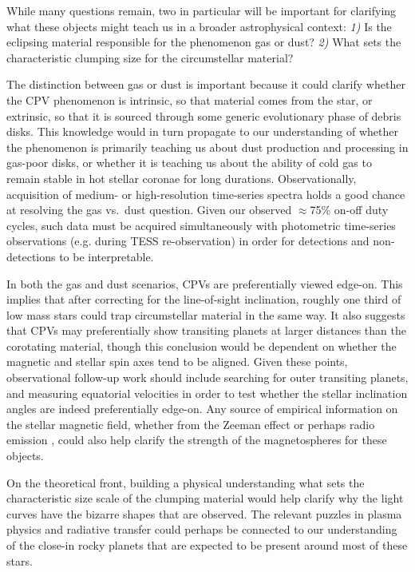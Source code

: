 \documentclass[11pt,twocolumn,tighten]{aastex63}
\begin{document}
While many questions remain, two in particular will be important for
clarifying what these objects might teach us in a broader
astrophysical context: {\it 1)} Is the eclipsing material responsible
for the phenomenon gas or dust?  {\it 2)} What sets the characteristic
clumping size for the circumstellar material?

The distinction between gas or dust is important because it could
clarify whether the CPV phenomenon is intrinsic, so that material
comes from the star, or extrinsic, so that it is sourced through some
generic evolutionary phase of debris disks.  This knowledge would in
turn propagate to our understanding of whether the phenomenon is
primarily teaching us about dust production and processing in gas-poor
disks, or whether it is teaching us about the ability of cold gas to
remain stable in hot stellar coronae for long durations.
Observationally, acquisition of medium- or high-resolution time-series
spectra holds a good chance at resolving the gas vs.~dust question.
Given our observed $\approx$75\% on-off duty cycles, such data must be
acquired simultaneously with photometric time-series observations
(e.g. during TESS re-observation) in order for detections and
non-detections to be interpretable.

In both the gas and dust scenarios, CPVs are preferentially viewed
edge-on.  This implies that after correcting for the line-of-sight
inclination, roughly one third of low mass stars \citep[those that
rotate rapidly enough;][]{2022AJ....163..144G} could trap circumstellar
material in the same way.  It also suggests that CPVs may
preferentially show transiting planets at larger distances than the
corotating material, though this conclusion would be dependent on whether the
magnetic and stellar spin axes tend to be aligned.  Given these
points, observational follow-up work should include searching for
outer transiting planets, and measuring equatorial velocities in order
to test whether the stellar inclination angles are indeed
preferentially edge-on.  Any source of empirical information on the
stellar magnetic field, whether from the Zeeman effect
\citep[e.g.][]{2021A&ARv..29....1K} or perhaps radio emission
\citep[e.g.][]{2015Natur.523..568H}, could also help clarify the
strength of the magnetospheres for these objects.

On the theoretical front, building a physical understanding what sets
the characteristic size scale of the clumping material would help
clarify why the light curves have the bizarre shapes that are
observed.  The relevant puzzles in plasma physics and radiative
transfer could perhaps be connected to our understanding of the
close-in rocky planets that are expected to be present around most of
these stars.
\end{document}
